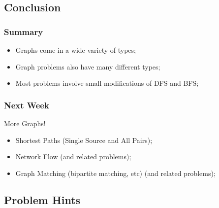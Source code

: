\documentclass{beamer}
\begin{document}
\subsection{Conclusion}
\begin{frame}
  \frametitle{Summary}
  \begin{itemize}
  \item Graphs come in a wide variety of types;
  \item Graph problems also have many different types;
  \item Most problems involve small modifications of DFS and BFS;
  \end{itemize}
\end{frame}

\begin{frame}
  \frametitle{Next Week}
  More Graphs!
  \begin{itemize}
  \item Shortest Paths (Single Source and All Pairs);
  \item Network Flow (and related problems);
  \item Graph Matching (bipartite matching, etc) (and related problems);
  \end{itemize}
\end{frame}

\subsection{Problem Hints}




%  

\end{document}

